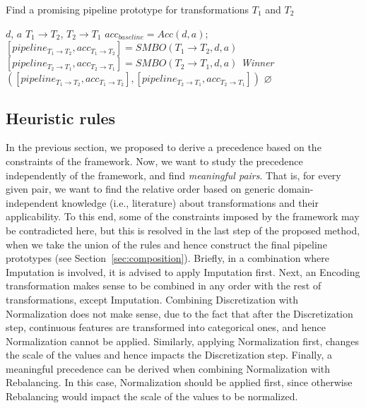 \begin{algorithm*}[!h]
	\caption{Find a promising pipeline prototype for transformations $T_1$ and $T_2$}
	\label{alg:learned-rules}
	\begin{algorithmic}[1]
		\Require $d$, $a$ 
		\Require \indent$T_1\rightarrow T_2$, $T_2 \rightarrow T_1$ 
		\State $acc_{baseline} = Acc(d,a)$; 
		\State $[pipeline_{T_1\rightarrow T_2},acc_{T_1\rightarrow T_2}] = SMBO(T_1\rightarrow T_2,d, a)$
		\State $[pipeline_{T_2\rightarrow T_1},acc_{T_2\rightarrow T_1}] = SMBO(T_2\rightarrow T_1,d, a)$
        \State \Return \textit{Winner}$([pipeline_{T_1\rightarrow T_2},acc_{T_1\rightarrow T_2}],[pipeline_{T_2\rightarrow T_1},acc_{T_2\rightarrow T_1}])$ 
		\Else
		\State \Return $\varnothing$
		\EndIf
	\end{algorithmic}
\end{algorithm*}

\subsection{Heuristic rules}
\label{effective-ssec:rules-heuristics}
In the previous section, we proposed to derive a precedence based on the constraints of the framework. Now, we want to study the precedence independently of the framework, and find \textit{meaningful pairs}. That is, for every given pair, we want to find the relative order based on generic domain-independent knowledge (i.e., literature) about transformations and their applicability.
To this end, some of the constraints imposed by the framework may be contradicted here, but this is resolved in the last step of the proposed method, when we take the union of the rules and hence construct the final pipeline prototypes (see Section~\ref{sec:composition}). Briefly, in a combination where Imputation is involved, it is advised to apply Imputation first. Next, an Encoding transformation makes sense to be combined in any order with the rest of transformations, except Imputation. 
Combining Discretization with Normalization does not make sense, due to the fact that after the Discretization step, continuous features are transformed into categorical ones, and hence Normalization cannot be applied. Similarly, applying Normalization first, changes the scale of the values and hence impacts the Discretization step. Finally, a meaningful precedence can be derived when combining Normalization with Rebalancing. In this case, Normalization should be applied first, since otherwise Rebalancing would impact the scale of the values to be normalized.


